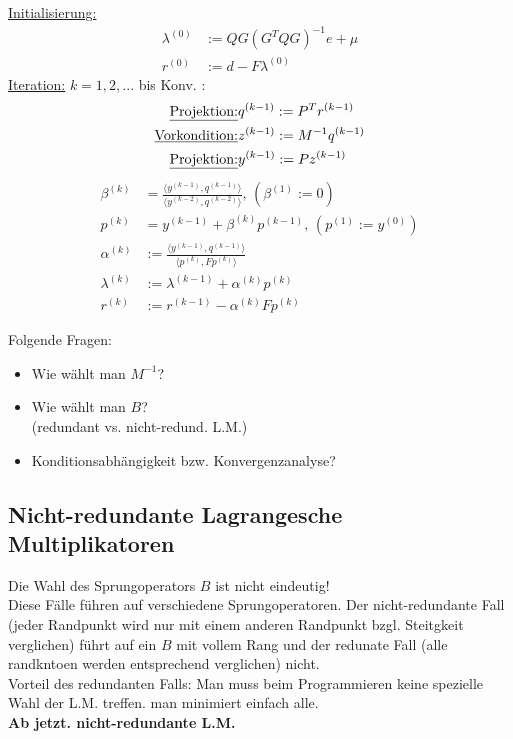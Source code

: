 \begin{algorithmus}
\underline{Initialisierung:}\\
\begin{align*}
  \lambda^{(0)} &:= QG(G^TQG)^{-1} e + \mu \\
  r^{(0)} &:= d- F \lambda^{(0)}
\end{align*}
\underline{Iteration:} $k=1,2,...$ bis Konv. : \\
\begin{align*}
  \text{\underline{Projektion:}} & q^{(k-1)} := P^T r^{(k-1)} \\
  \text{\underline{Vorkondition:}} & z^{(k-1)} := M^{-1} q^{(k-1)} \\
  \text{\underline{Projektion:}} & y^{(k-1)} := P z^{(k-1)}
\end{align*}
\begin{align*}
  \beta^{(k)} &= \frac{\langle y^{(k-1)} , q^{(k-1)} \rangle}{\langle y^{(k-2)} , q^{(k-2)} \rangle}, \, (\beta^{(1)}:=0 ) \\
  p^{(k)} &= y^{(k-1)} + \beta^{(k)}p^{(k-1)} , \, (p^{(1)}:=y^{(0)}) \\
  \alpha^{(k)} &:= \frac{\langle y^{(k-1)} , q ^{(k-1)} \rangle}{ \langle p^{(k)} , F p^{(k)} \rangle } \\
  \lambda^{(k)} &:= \lambda^{(k-1)} + \alpha^{(k)}p^{(k)} \\
  r^{(k)} &:= r^{(k-1)} - \alpha^{(k)}Fp^{(k)}
\end{align*}
\end{algorithmus}
Folgende Fragen:
\begin{itemize}
  \item
    Wie wählt man $M^{-1}$?
  \item
    Wie wählt man $B$?\\
    (redundant vs. nicht-redund. L.M.)
  \item
    Konditionsabhängigkeit bzw. Konvergenzanalyse?
\end{itemize}

\subsection{Nicht-redundante Lagrangesche Multiplikatoren}

Die Wahl des Sprungoperators $B$ ist nicht eindeutig! \\
Diese Fälle führen auf verschiedene Sprungoperatoren. Der nicht-redundante Fall (jeder Randpunkt wird nur mit einem anderen Randpunkt bzgl. Steitgkeit verglichen) führt auf ein $B$ mit vollem Rang und der redunate Fall (alle randkntoen werden entsprechend verglichen) nicht. \\
Vorteil des redundanten Falls: Man muss beim Programmieren keine spezielle Wahl der L.M. treffen. man minimiert einfach alle.\\
\textbf{Ab jetzt. nicht-redundante L.M. }\\


